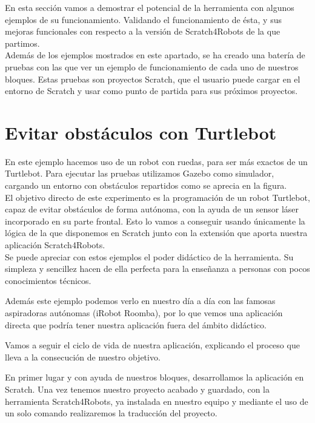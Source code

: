 En esta sección vamos a demostrar el potencial de la herramienta con algunos ejemplos de su funcionamiento. Validando el funcionamiento de ésta, y sus mejoras funcionales con respecto a la versión de Scratch4Robots de la que partimos.\\

Además de los ejemplos mostrados en este apartado, se ha creado una batería de pruebas con las que ver un ejemplo de funcionamiento de cada uno de nuestros bloques. Estas pruebas son proyectos Scratch, que el usuario puede cargar en el entorno de Scratch y usar como punto de partida para sus próximos proyectos.

\section{Evitar obstáculos con Turtlebot}
\label{sec:evitar-obstaculos}

En este ejemplo hacemos uso de un robot con ruedas, para ser más exactos de un Turtlebot. Para ejecutar las pruebas utilizamos Gazebo como simulador, cargando un entorno con obstáculos repartidos como se aprecia en la figura.\\

El objetivo directo de este experimento es la programación de un robot Turtlebot, capaz de evitar obstáculos de forma autónoma, con la ayuda de un sensor láser incorporado en su parte frontal. Esto lo vamos a conseguir usando únicamente la lógica de la que disponemos en Scratch junto con la extensión que aporta nuestra aplicación Scratch4Robots.\\

Se puede apreciar con estos ejemplos el poder didáctico de la herramienta. Su simpleza y sencillez hacen de ella perfecta para la enseñanza a personas con pocos conocimientos técnicos.

Además este ejemplo podemos verlo en nuestro día a día con las famosas aspiradoras autónomas (iRobot Roomba), por lo que vemos una aplicación directa que podría tener nuestra aplicación fuera del ámbito didáctico.

Vamos a seguir el ciclo de vida de nuestra aplicación, explicando el proceso que lleva a la consecución de nuestro objetivo.

En primer lugar y con ayuda de nuestros bloques, desarrollamos la aplicación en Scratch. Una vez tenemos nuestro proyecto acabado y guardado, con la herramienta Scratch4Robots, ya instalada en nuestro equipo y mediante el uso de un solo comando realizaremos la traducción del proyecto.\\

